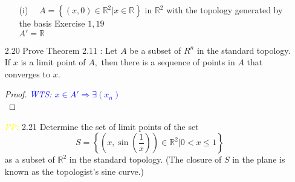 \documentclass[12pt]{article}
\newcommand{\R}{\mathbb{R}}
\newcommand{\wts}[1]{\textit{\textcolor{blue}{WTS: #1}}\\}
\newcommand{\pp}{\textit{\textcolor{yellow}{PP: }}}%
\begin{document}
\begin{enumerate}
\begin{enumerate}
			\item[(i)] $\quad A=\left\{(x, 0) \in \mathbb{R}^{2} | x \in \mathbb{R}\right\}$ in $\mathbb{R}^{2}$ with the topology generated by the basis Exercise $1,19$\\
			$ A' = \R $
		\end{enumerate}
		\item[2.20] Prove Theorem 2.11 : Let $A$ be a subset of $R^{n}$ in the standard topology. If $x$ is a limit point of $A,$ then there is a sequence of points in $A$ that converges to $x$.
		\begin{proof}
			\wts{$ x \in A' \Rightarrow \exists (x_n)$}
		\end{proof}
		\item[\pp2.21] Determine the set of limit points of the set
		$$
		S=\left\{\left(x, \sin \left(\frac{1}{x}\right)\right) \in \mathbb{R}^{2} | 0<x \leq 1\right\}
		$$
		as a subset of $\mathbb{R}^{2}$ in the standard topology. (The closure of $S$ in the plane is known as the topologist's sine curve.)
		
	\end{enumerate}
\end{document}
